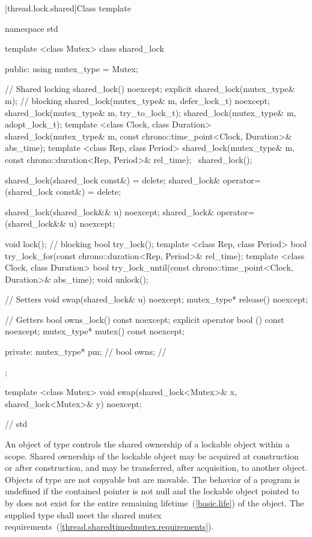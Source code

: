 [thread.lock.shared]{Class template }

\begin{codeblock}
namespace std {

template <class Mutex>
class shared_lock {
public:
  using mutex_type = Mutex;

  // Shared locking
  shared_lock() noexcept;
  explicit shared_lock(mutex_type& m);  // blocking
  shared_lock(mutex_type& m, defer_lock_t) noexcept;
  shared_lock(mutex_type& m, try_to_lock_t);
  shared_lock(mutex_type& m, adopt_lock_t);
  template <class Clock, class Duration>
    shared_lock(mutex_type& m,
                const chrono::time_point<Clock, Duration>& abs_time);
  template <class Rep, class Period>
    shared_lock(mutex_type& m,
                const chrono::duration<Rep, Period>& rel_time);
  ~shared_lock();

  shared_lock(shared_lock const&) = delete;
  shared_lock& operator=(shared_lock const&) = delete;

  shared_lock(shared_lock&& u) noexcept;
  shared_lock& operator=(shared_lock&& u) noexcept;

  void lock();  // blocking
  bool try_lock();
  template <class Rep, class Period>
    bool try_lock_for(const chrono::duration<Rep, Period>& rel_time);
  template <class Clock, class Duration>
    bool try_lock_until(const chrono::time_point<Clock, Duration>& abs_time);
  void unlock();

  // Setters
  void swap(shared_lock& u) noexcept;
  mutex_type* release() noexcept;

  // Getters
  bool owns_lock() const noexcept;
  explicit operator bool () const noexcept;
  mutex_type* mutex() const noexcept;

private:
  mutex_type* pm; // \expos
  bool owns;      // \expos
};

template <class Mutex>
  void swap(shared_lock<Mutex>& x, shared_lock<Mutex>& y) noexcept;

}  // std
\end{codeblock}

\pnum
An object of type  controls the shared ownership of a
lockable object within a scope. Shared ownership of the lockable object may be
acquired at construction or after construction, and may be transferred, after
acquisition, to another  object. Objects of type
 are not copyable but are movable. The behavior of a program
is undefined if the contained pointer  is not null and the lockable
object pointed to by  does not exist for the entire remaining
lifetime~(\ref{basic.life}) of the  object. The supplied
 type shall meet the shared mutex
requirements~(\ref{thread.sharedtimedmutex.requirements}).

